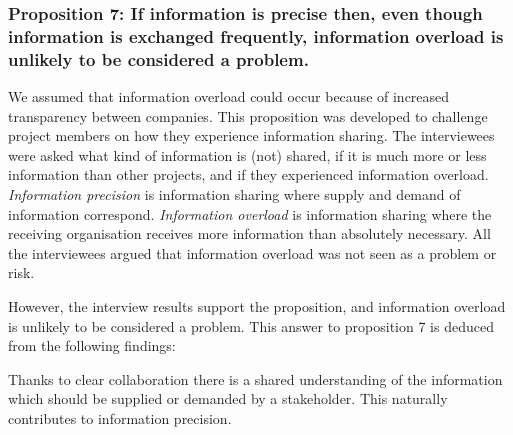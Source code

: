 
\subsubsection{Proposition 7: If information is precise then, even though information is exchanged frequently, information overload is unlikely to be considered a problem.}

We assumed that information overload could occur because of increased transparency between companies. This proposition was developed to challenge project members on how they experience information sharing. The interviewees were asked what kind of information is (not) shared, if it is much more or less information than other projects, and if they experienced information overload. {\em Information precision} is information sharing where supply and demand of information correspond. {\em Information overload} is information sharing where the receiving organisation receives more information than absolutely necessary. All the interviewees argued that information overload was not seen as a problem or risk.

However, the interview results support the proposition, and information overload is unlikely to be considered a problem. This answer to proposition 7 is deduced from the following findings:

 Thanks to clear collaboration there is a shared understanding of the information which should be supplied or demanded by a stakeholder. This naturally contributes to information precision.

